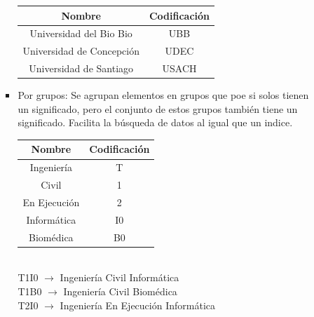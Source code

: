 \documentclass{templateNote}
\begin{document}
\begin{itemize}
\begin{itemize}
\begin{itemize}
\begin{tcolorbox}[colback=green!10!white,colframe=green!75!black,title=Ejemplo de codificación Nemotécnica]
                    \begin{center}
                        \begin{tabular}{|c|c|}
                            \hline
                            \textbf{Nombre} & \textbf{Codificación} \\ \hline
                            Universidad del Bio Bio & UBB \\ \hline
                            Universidad de Concepción & UDEC \\ \hline
                            Universidad de Santiago & USACH \\ \hline
                        \end{tabular}
                    \end{center}
                \end{tcolorbox}
                \item Por grupos: Se agrupan elementos en grupos que poe si solos tienen un significado, pero el conjunto de estos grupos también tiene un significado. Facilita la búsqueda de datos al igual que un indice.
                \begin{tcolorbox}[colback=green!10!white,colframe=green!75!black,title=Ejemplo de codificación Por grupos]
                    \begin{center}
                        \begin{tabular}{|c|c|}
                            \hline
                            \textbf{Nombre} & \textbf{Codificación} \\ \hline
                            Ingeniería & T \\ \hline
                            Civil & 1 \\ \hline
                            En Ejecución & 2 \\ \hline
                            Informática & I0 \\ \hline
                            Biomédica & B0 \\ \hline
                        \end{tabular}
                        \\[0.5cm]
                        T1I0 $\rightarrow$ Ingeniería Civil Informática \\
                        T1B0 $\rightarrow$ Ingeniería Civil Biomédica \\
                        T2I0 $\rightarrow$ Ingeniería En Ejecución Informática
                    \end{center}

\end{tcolorbox}
\end{itemize}
\end{itemize}
\end{itemize}
\end{document}
